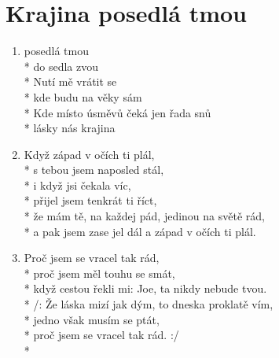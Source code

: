 \section{Krajina posedlá tmou}
\begin{enumerate}
\item {} posedlá tmou   \\*
 do sedla zvou    \\*
Nutí mě vrátit se     \\*
kde budu na věky sám   \\*
Kde místo úsměvů  čeká jen řada snů  \\*
 lásky nás    krajina   
\item Když západ v očích ti plál, \\*
s tebou jsem naposled stál, \\*
i když jsi čekala víc, \\*
přijel jsem tenkrát ti říct, \\*
že mám tě, na každej pád, jedinou na světě rád, \\*
a pak jsem zase jel dál a západ v očích ti plál. 
\item Proč jsem se vracel tak rád, \\*
proč jsem měl touhu se smát, \\*
když cestou řekli mi: Joe, ta nikdy nebude tvou. \\*
/: Že láska mizí jak dým, to dneska proklatě vím, \\*
jedno však musím se ptát, \\*
proč jsem se vracel tak rád. :/ \\*
\end{enumerate}
